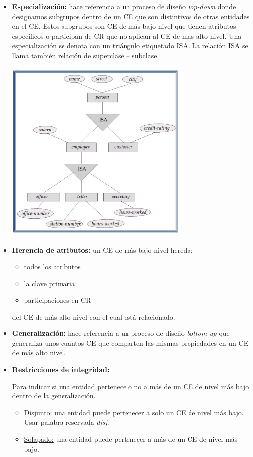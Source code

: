 \documentclass[12pt,a4paper]{report}
\begin{document}
		\begin{itemize}
			\item \textbf{Especialización:} hace referencia a un proceso de diseño \textit{top-down} donde designamos subgrupos dentro de un CE que son distintivos de otras entidades en el CE. Estos subgrupos son CE de más bajo nivel que tienen atributos específicos o participan de CR que no aplican al CE de más alto nivel. Una especialización se denota con un triángulo etiquetado ISA. La relación ISA se llama también relación de superclase – subclase.
			
			\begin{center}
				\includegraphics[width=9cm, height=9cm]{./imagenes/especializacion.png}
			\end{center}
		
			\item \textbf{Herencia de atributos:} un CE de más bajo nivel hereda:
				\begin{itemize}
					\item todos los atributos
					\item la clave primaria
					\item participaciones en CR  
				\end{itemize}
				\par del CE de más alto nivel con el cual está relacionado.
			\item \textbf{Generalización:} hace referencia a un proceso de diseño \textit{bottom-up} que generaliza unos cuantos CE que comparten las mismas propiedades en un CE de más alto nivel.
			
			\item \textbf{Restricciones de integridad:}
           \par Para indicar si una entidad pertenece o no a más de un CE de nivel más bajo dentro de la generalización.
         		\begin{itemize}
         			\item \underline{Disjunto:} una entidad puede pertenecer a solo un CE de nivel más bajo. Usar palabra reservada \textit{disj}.
					\item \underline{Solapado:} una entidad puede pertenecer a más de un CE de nivel más bajo.
				\end{itemize}         		  
		

\end{itemize}
\end{document}
